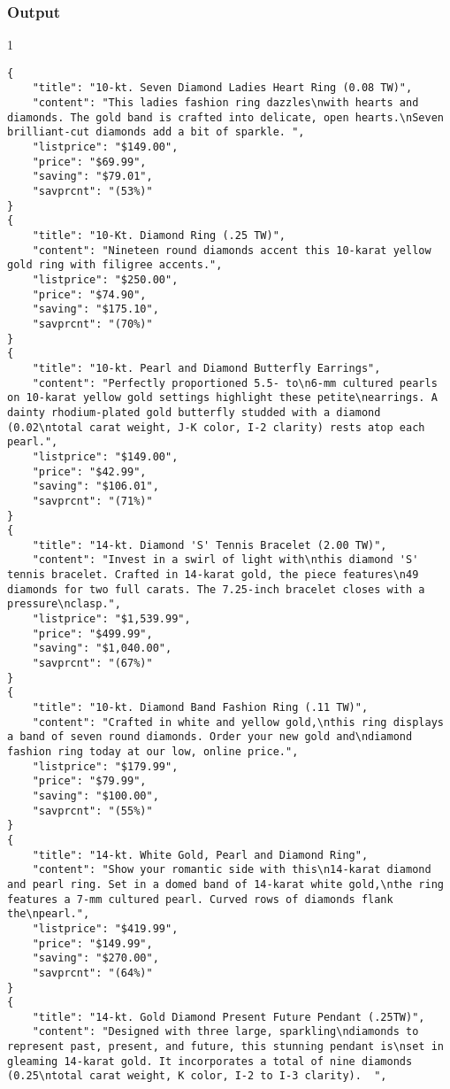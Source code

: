\documentclass[runningheads]{llncs}
\begin{document}
\subsubsection{Output}
 1
\begin{lstlisting}
{
    "title": "10-kt. Seven Diamond Ladies Heart Ring (0.08 TW)",
    "content": "This ladies fashion ring dazzles\nwith hearts and diamonds. The gold band is crafted into delicate, open hearts.\nSeven brilliant-cut diamonds add a bit of sparkle. ",
    "listprice": "$149.00",
    "price": "$69.99",
    "saving": "$79.01",
    "savprcnt": "(53%)"
}
{
    "title": "10-Kt. Diamond Ring (.25 TW)",
    "content": "Nineteen round diamonds accent this 10-karat yellow gold ring with filigree accents.",
    "listprice": "$250.00",
    "price": "$74.90",
    "saving": "$175.10",
    "savprcnt": "(70%)"
}
{
    "title": "10-kt. Pearl and Diamond Butterfly Earrings",
    "content": "Perfectly proportioned 5.5- to\n6-mm cultured pearls on 10-karat yellow gold settings highlight these petite\nearrings. A dainty rhodium-plated gold butterfly studded with a diamond (0.02\ntotal carat weight, J-K color, I-2 clarity) rests atop each pearl.",
    "listprice": "$149.00",
    "price": "$42.99",
    "saving": "$106.01",
    "savprcnt": "(71%)"
}
{
    "title": "14-kt. Diamond 'S' Tennis Bracelet (2.00 TW)",
    "content": "Invest in a swirl of light with\nthis diamond 'S' tennis bracelet. Crafted in 14-karat gold, the piece features\n49 diamonds for two full carats. The 7.25-inch bracelet closes with a pressure\nclasp.",
    "listprice": "$1,539.99",
    "price": "$499.99",
    "saving": "$1,040.00",
    "savprcnt": "(67%)"
}
{
    "title": "10-kt. Diamond Band Fashion Ring (.11 TW)",
    "content": "Crafted in white and yellow gold,\nthis ring displays a band of seven round diamonds. Order your new gold and\ndiamond fashion ring today at our low, online price.",
    "listprice": "$179.99",
    "price": "$79.99",
    "saving": "$100.00",
    "savprcnt": "(55%)"
}
{
    "title": "14-kt. White Gold, Pearl and Diamond Ring",
    "content": "Show your romantic side with this\n14-karat diamond and pearl ring. Set in a domed band of 14-karat white gold,\nthe ring features a 7-mm cultured pearl. Curved rows of diamonds flank the\npearl.",
    "listprice": "$419.99",
    "price": "$149.99",
    "saving": "$270.00",
    "savprcnt": "(64%)"
}
{
    "title": "14-kt. Gold Diamond Present Future Pendant (.25TW)",
    "content": "Designed with three large, sparkling\ndiamonds to represent past, present, and future, this stunning pendant is\nset in gleaming 14-karat gold. It incorporates a total of nine diamonds (0.25\ntotal carat weight, K color, I-2 to I-3 clarity).  ",

\end{lstlisting}
\end{document}

